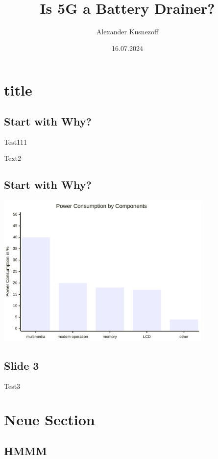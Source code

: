 \documentclass{beamer}
\title{Is 5G a Battery Drainer?}
\subtitle{}
\author{Alexander Kusnezoff}
\date{16.07.2024}
\begin{document}
\maketitle

\section{title}\label{title}

\subsection{Start with Why?}\label{start-with-why}

Test111

\pause

Text2

\subsection{Start with Why?}\label{start-with-why-1}

\begin{center}
\includegraphics[width=0.8\textwidth]{./img/prosem-einleitung.png}
\end{center}

\subsection{Slide 3}\label{slide-3}

Test3

\section{Neue Section}\label{neue-section}

\subsection{HMMM}\label{hmmm}
\end{document}
